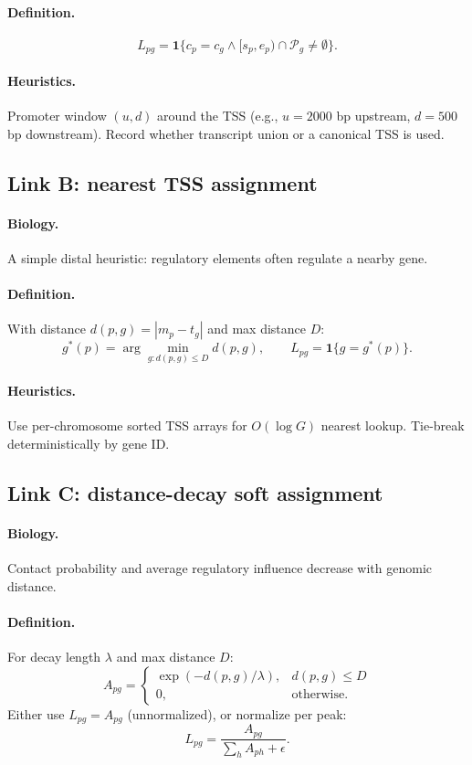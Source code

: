 \documentclass[11pt]{article}
\begin{document}
\paragraph{Definition.}
\[
L_{pg} = \mathbf{1}\{ c_p=c_g \wedge [s_p,e_p) \cap \mathcal{P}_g \neq \emptyset \}.
\]
\paragraph{Heuristics.} Promoter window $(u,d)$ around the TSS (e.g., $u=2000$ bp upstream, $d=500$ bp downstream). Record whether transcript union or a canonical TSS is used.

\subsection{Link B: nearest TSS assignment}
\paragraph{Biology.} A simple distal heuristic: regulatory elements often regulate a nearby gene.
\paragraph{Definition.} With distance $d(p,g)=|m_p-t_g|$ and max distance $D$:
\[
g^*(p)=\arg\min_{g: d(p,g)\le D} d(p,g), \qquad L_{pg}=\mathbf{1}\{g=g^*(p)\}.
\]
\paragraph{Heuristics.} Use per-chromosome sorted TSS arrays for $O(\log G)$ nearest lookup. Tie-break deterministically by gene ID.

\subsection{Link C: distance-decay soft assignment}
\paragraph{Biology.} Contact probability and average regulatory influence decrease with genomic distance.
\paragraph{Definition.} For decay length $\lambda$ and max distance $D$:
\[
A_{pg} =
\begin{cases}
\exp(-d(p,g)/\lambda), & d(p,g)\le D \\
0, & \text{otherwise.}
\end{cases}
\]
Either use $L_{pg}=A_{pg}$ (unnormalized), or normalize per peak:
\[
L_{pg} = \frac{A_{pg}}{\sum_h A_{ph}+\epsilon}.
\]
\end{document}
